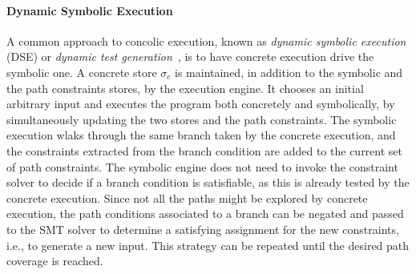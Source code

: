 \newcommand{\dse}{DSE}
\paragraph{Dynamic Symbolic Execution} A common approach to concolic execution, known as {\em dynamic symbolic execution} (\dse) or {\em dynamic test  generation}~\cite{DART-PLDI05}, is to have concrete execution drive the symbolic one. A concrete store $\sigma_c$ is maintained, in addition to the symbolic and the path constraints stores, by the execution engine. It chooses an initial arbitrary input and executes the program both concretely and symbolically, by simultaneously updating the two stores and the path constraints. The symbolic execution wlaks through the same branch taken by the concrete execution, and the constraints extracted from the branch condition are added to the current set of path constraints. The symbolic engine does not need to invoke the constraint solver to decide if a branch condition is satisfiable, as this is already tested by the concrete execution. Since not all the paths might be explored by concrete execution, the path conditions associated to a branch can be negated and passed to the SMT solver to determine a satisfying assignment for the new constraints, i.e., to generate a new input. This strategy can be repeated until the desired path coverage is reached.

\vspace{-2pt} 

